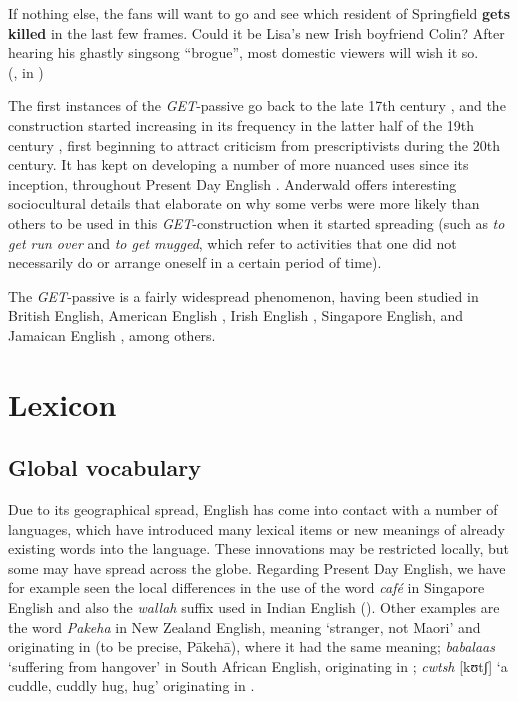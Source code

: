 \begin{exe}
    \ex If nothing else, the fans will want to go and see which resident of Springfield \textbf{gets killed} in the last few frames. Could it be Lisa's new Irish boyfriend Colin? After hearing his ghastly singsong ``brogue'', most domestic viewers will wish it so.\\(\citealp[9]{AmadorMoreno2010}, in \citealp[1138]{Nolan2012})
\end{exe}

\noindent The first instances of the \emph{GET}-passive go back to the late 17th century \citep[227]{Fleisher2006}, and the construction started increasing in its frequency in the latter half of the 19th century \citep[3]{Anderwald2018}, first beginning to attract criticism from prescriptivists during the 20th century. It has kept on developing a number of more nuanced uses since its inception, throughout Present Day English \citep[1--2]{Anderwald2018}. Anderwald offers interesting sociocultural details that elaborate on why some verbs were more likely than others to be used in this \emph{GET}-construction when it started spreading (such as \textit{to get run over} and \textit{to get mugged}, which refer to activities that one did not necessarily do or arrange oneself in a certain period of time).

The \emph{GET}-passive is a fairly widespread phenomenon, having been studied in British English, American English \citep{Hundt2001}, Irish English \citep{Nolan2012}, Singapore English, and Jamaican English \citep{Bruckmaier2016}, among others.

\section{Lexicon}
\subsection{Global vocabulary}
Due to its geographical spread, English has come into contact with a number of languages, which have introduced many lexical items or new meanings of already existing words into the language. These innovations may be restricted locally, but some may have spread across the globe. Regarding Present Day English, we have for example seen the local differences in the use of the word \emph{café} in Singapore English and also the \emph{wallah} suffix used in Indian English (). Other examples are the word \emph{Pakeha} in New Zealand English, meaning `stranger, not Maori' and originating in  (to be precise, Pākehā), where it had the same meaning; \emph{babalaas} `suffering from hangover' in South African English, originating in ; \emph{cwtsh} [kʊtʃ] `a cuddle, cuddly hug, hug' originating in .

